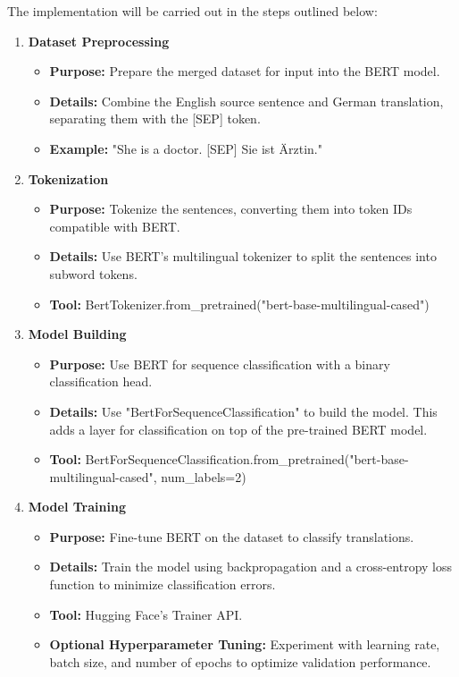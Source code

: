 \documentclass[oneside, paper=A4, DIV=15]{scrartcl}
\begin{document}
\begin{description}
The implementation will be carried out in the steps outlined below:

\begin{enumerate}
    \item \textbf{Dataset Preprocessing}
    \begin{itemize}
        \item \textbf{Purpose:} Prepare the merged dataset for input into the BERT model. 
        \item \textbf{Details:} Combine the English source sentence and German translation, separating them with the [SEP] token.
        \item \textbf{Example:} "She is a doctor. [SEP] Sie ist Ärztin."
    \end{itemize}
    
    \item \textbf{Tokenization}
    \begin{itemize}
        \item \textbf{Purpose:} Tokenize the sentences, converting them into token IDs compatible with BERT.
        \item \textbf{Details:} Use BERT’s multilingual tokenizer to split the sentences into subword tokens.
        \item \textbf{Tool:} BertTokenizer.from\_pretrained("bert-base-multilingual-cased")
    \end{itemize}

    \item \textbf{Model Building}
    \begin{itemize}
        \item \textbf{Purpose:} Use BERT for sequence classification with a binary classification head.
        \item \textbf{Details:} Use "BertForSequenceClassification" to build the model. This adds a layer for classification on top of the pre-trained BERT model.
        \item \textbf{Tool:} BertForSequenceClassification.from\_pretrained("bert-base-multilingual-cased",  num\_labels=2)
    \end{itemize}
    
    \item \textbf{Model Training}
    \begin{itemize}
        \item \textbf{Purpose:} Fine-tune BERT on the dataset to classify translations.
        \item \textbf{Details:} Train the model using backpropagation and a cross-entropy loss function to minimize classification errors.
        \item \textbf{Tool:} Hugging Face's Trainer API.
        \item \textbf{Optional Hyperparameter Tuning:} Experiment with learning rate, batch size, and number of epochs to optimize validation performance.
    \end{itemize}


\end{enumerate}
\end{description}
\end{document}
